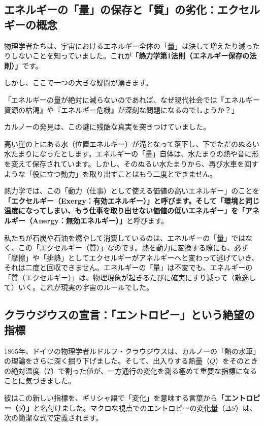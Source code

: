 \subsection{エネルギーの「量」の保存と「質」の劣化：エクセルギーの概念}

物理学者たちは、宇宙におけるエネルギー全体の「量」は決して増えたり減ったりしないことを知っていました。これが\textbf{「熱力学第1法則（エネルギー保存の法則）」}です。

しかし、ここで一つの大きな疑問が湧きます。

「エネルギーの量が絶対に減らないのであれば、なぜ現代社会では『エネルギー資源の枯渇』や『エネルギー危機』が深刻な問題になるのでしょうか？」

カルノーの発見は、この謎に残酷な真実を突きつけていました。

高い崖の上にある水（位置エネルギー）が滝となって落下し、下でただのぬるい水たまりになったとします。エネルギーの「量」自体は、水たまりの熱や音に形を変えて保存されています。しかし、そのぬるい水たまりから、再び水車を回すような「役に立つ動力」を取り出すことはもう二度とできません。

熱力学では、この「動力（仕事）として使える価値の高いエネルギー」のことを\textbf{「エクセルギー（Exergy：有効エネルギー）」と呼びます。そして「環境と同じ温度になってしまい、もう仕事を取り出せない価値の低いエネルギー」を「アネルギー（Anergy：無効エネルギー）」}と呼びます。

私たちが石炭や石油を燃やして消費しているのは、エネルギーの「量」ではなく、この「エクセルギー（質）」なのです。熱を動力に変換する際にも、必ず「摩擦」や「排熱」としてエクセルギーがアネルギーへと変わって逃げていき、それは二度と回収できません。エネルギーの「量」は不変でも、エネルギーの「質（エクセルギー）」は、物理現象が起きるたびに確実にすり減って（散逸して）いく。これが現実の宇宙のルールでした。

\subsection{クラウジウスの宣言：「エントロピー」という絶望の指標}

1865年、ドイツの物理学者ルドルフ・クラウジウスは、カルノーの「熱の水車」の理論をさらに深く掘り下げました。そして、出入りする熱量（\(Q\)）をそのときの絶対温度（\(T\)）で割った値が、一方通行の変化を測る極めて重要な指標になることに気づきました。

彼はこの新しい指標を、ギリシャ語で「変化」を意味する言葉から\textbf{「エントロピー（\(S\)）」}と名付けました。マクロな視点でのエントロピーの変化量（\(\Delta S\)）は、次の簡潔な式で定義されます。

